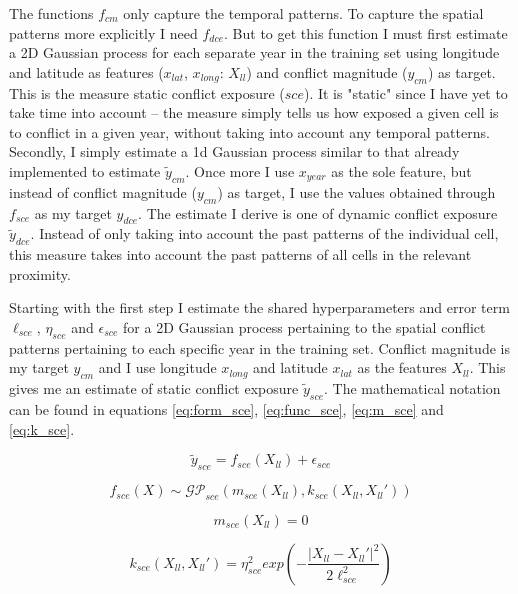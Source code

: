 \documentclass[a4paper]{article}
\begin{document}
The functions $f_{cm}$ only capture the temporal patterns. To capture the spatial patterns more explicitly I need $f_{dce}$. But to get this function I must first estimate a 2D Gaussian process for each separate year in the training set using longitude and latitude as features ($x_{lat}$, $x_{long}$: $X_{ll}$) and conflict magnitude ($y_{cm}$) as target. This is the measure static conflict exposure ($sce$). It is "static" since I have yet to take time into account -- the measure simply tells us how exposed a given cell is to conflict in a given year, without taking into account any temporal patterns. Secondly, I simply estimate a 1d Gaussian process similar to that already implemented to estimate $\tilde{y}_{cm}$. Once more I use $x_{year}$ as the sole feature, but instead of conflict magnitude ($y_{cm}$) as target, I use the values obtained through $f_{sce}$ as my target $y_{dce}$. The estimate I derive is one of dynamic conflict exposure $\tilde{y}_{dce}$. Instead of only taking into account the past patterns of the individual cell, this measure takes into account the past patterns of all cells in the relevant proximity.\par 

Starting with the first step I estimate the shared hyperparameters and error term $\ell_{sce}$, $\eta_{sce}$ and $\epsilon_{sce}$ for a 2D Gaussian process pertaining to the spatial conflict patterns pertaining to each specific year in the training set. Conflict magnitude is my target $y_{cm}$ and I use longitude $x_{long}$ and latitude $x_{lat}$ as the features $X_{ll}$. This gives me an estimate of static conflict exposure $\tilde{y}_{sce}$. The mathematical notation can be found in equations \ref{eq:form_sce}, \ref{eq:func_sce}, \ref{eq:m_sce} and \ref{eq:k_sce}.\par


\[
\tilde{y}_{sce} = f_{sce}(X_{ll}) + \epsilon_{sce} \tag{23} \label{eq:form_sce}
\]

\[
f_{sce}(X) \sim \mathcal{GP}_{sce}(m_{sce}(X_{ll}),k_{sce}(X_{ll},X_{ll}')) \tag{24} \label{eq:func_sce}
\]

\[
m_{sce}(X_{ll}) = 0 \tag{25} \label{eq:m_sce}
\]

\[
k_{sce}(X_{ll},X_{ll}') = \eta_{sce}^2 exp\left(-\frac{|X_{ll}-X_{ll}'|^2}{2\ell_{sce}^2}\right) \tag{26} \label{eq:k_sce}
\]
\end{document}
